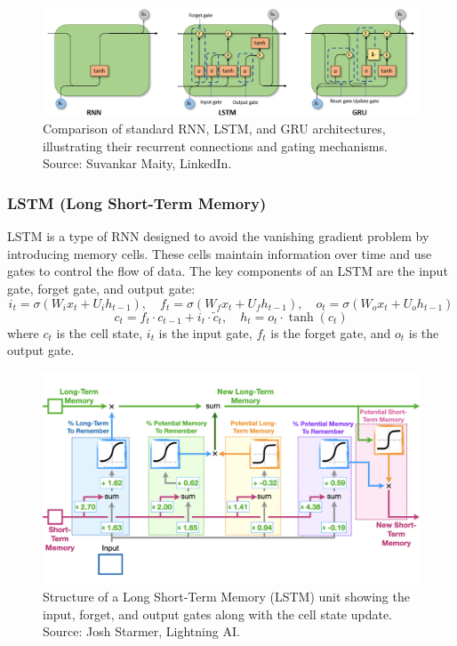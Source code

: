 \documentclass{article}
\begin{document}
\begin{figure}[ht]
    \centering
    \includegraphics[width=0.9\linewidth]{graphics/S6RNN/rnn_architectures.png}
    \caption{Comparison of standard RNN, LSTM, and GRU architectures, illustrating their recurrent connections and gating mechanisms. Source: Suvankar Maity, LinkedIn.}
    \label{fig:rnn-architectures}
\end{figure}

\subsubsection{LSTM (Long Short-Term Memory)}
LSTM is a type of RNN designed to avoid the vanishing gradient problem by introducing memory cells. These cells maintain information over time and use gates to control the flow of data. The key components of an LSTM are the input gate, forget gate, and output gate:
\[
i_t = \sigma(W_i x_t + U_i h_{t-1}), \quad f_t = \sigma(W_f x_t + U_f h_{t-1}), \quad o_t = \sigma(W_o x_t + U_o h_{t-1})
\]
\[
c_t = f_t \cdot c_{t-1} + i_t \cdot \tilde{c}_t, \quad h_t = o_t \cdot \tanh(c_t)
\]
where \(c_t\) is the cell state, \(i_t\) is the input gate, \(f_t\) is the forget gate, and \(o_t\) is the output gate.

\begin{figure}[ht]
    \centering
    \includegraphics[width=0.9\linewidth]{graphics/S6RNN/lstm_maths.png}
    \caption{Structure of a Long Short‑Term Memory (LSTM) unit showing the input, forget, and output gates along with the cell state update. Source: Josh Starmer, Lightning AI.}
    \label{fig:lstm-unit}
\end{figure}
\end{document}
